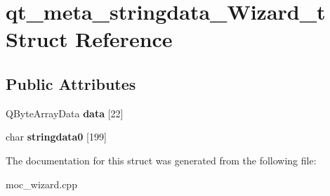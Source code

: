 \hypertarget{structqt__meta__stringdata___wizard__t}{}\section{qt\+\_\+meta\+\_\+stringdata\+\_\+\+Wizard\+\_\+t Struct Reference}
\label{structqt__meta__stringdata___wizard__t}
\subsection*{Public Attributes}
\begin{DoxyCompactItemize}
\item 
\hypertarget{structqt__meta__stringdata___wizard__t_abacf3e0c4161e300662056e354f10ef6}{}Q\+Byte\+Array\+Data {\bfseries data} \mbox{[}22\mbox{]}\label{structqt__meta__stringdata___wizard__t_abacf3e0c4161e300662056e354f10ef6}

\item 
\hypertarget{structqt__meta__stringdata___wizard__t_ab580891115b098af2494f04b9633726c}{}char {\bfseries stringdata0} \mbox{[}199\mbox{]}\label{structqt__meta__stringdata___wizard__t_ab580891115b098af2494f04b9633726c}

\end{DoxyCompactItemize}


The documentation for this struct was generated from the following file\+:\begin{DoxyCompactItemize}
\item 
moc\+\_\+wizard.\+cpp\end{DoxyCompactItemize}
